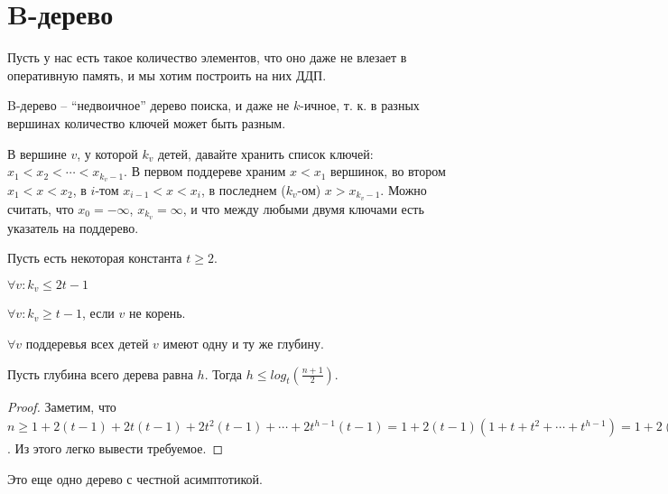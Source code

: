 \section{B-дерево}



Пусть у нас есть такое количество элементов, что оно даже не влезает в оперативную память, и мы хотим построить на них ДДП.

\begin{definition}
    B-дерево -- ``недвоичное'' дерево поиска, и даже не $k$-ичное, т. к. в разных вершинах количество ключей может быть разным.
\end{definition}

В вершине $v$, у которой $k_v$ детей, давайте хранить список ключей: $x_1 < x_2 < \cdots < x_{k_v - 1}$. В первом поддереве храним $x < x_1$ вершинок, во втором $x_1 < x < x_2$, в $i$-том $x_{i-1} < x < x_i$, в последнем ($k_v$-ом) $x > x_{k_v - 1}$. Можно считать, что $x_0 = -\infty$, $x_{k_v} = \infty$, и что между любыми двумя ключами есть указатель на поддерево.

Пусть есть некоторая константа $t \geq 2$.

\begin{invariant}
    $\forall v: k_v \leq 2t - 1$
\end{invariant}

\begin{invariant}
    $\forall v: k_v \geq t - 1$, если $v$ не корень.
\end{invariant}

\begin{invariant}
    $\forall v$ поддеревья всех детей $v$ имеют одну и ту же глубину.
\end{invariant}


\begin{proposition}
    Пусть глубина всего дерева равна $h$. Тогда $h \leq log_t(\frac{n+1}{2})$.
\end{proposition}

\begin{proof}
    Заметим, что $n \geq 1 + 2(t-1) + 2t(t-1) + 2t^2 (t-1) + \cdots + 2t^{h-1} (t-1) = 1 + 2(t-1)(1 + t + t^2 + \cdots + t^{h-1}) = 1 + 2(t-1)(\frac{t^h - 1}{t-1}) = 1 + 2(t^h - 1) = 2t^h - 1$. Из этого легко вывести требуемое.
\end{proof}

\begin{note}
    Это еще одно дерево с честной асимптотикой.
\end{note}



